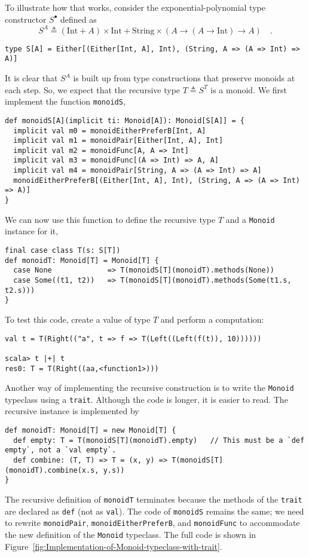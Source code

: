 To illustrate how that works, consider the exponential-polynomial
type constructor $S^{\bullet}$ defined as
\[
S^{A}\triangleq\left(\text{Int}+A\right)\times\text{Int}+\text{String}\times\left(A\rightarrow\left(A\rightarrow\text{Int}\right)\rightarrow A\right)\quad.
\]
\begin{lstlisting}
type S[A] = Either[(Either[Int, A], Int), (String, A => (A => Int) => A)]
\end{lstlisting}

It is clear that $S^{A}$ is built up from type constructions that
preserve monoids at each step. So, we expect that the recursive type
$T\triangleq S^{T}$ is a monoid. We first implement the function
\lstinline!monoidS!,
\begin{lstlisting}
def monoidS[A](implicit ti: Monoid[A]): Monoid[S[A]] = {
  implicit val m0 = monoidEitherPreferB[Int, A]
  implicit val m1 = monoidPair[Either[Int, A], Int]
  implicit val m2 = monoidFunc[A, A => Int]
  implicit val m3 = monoidFunc[(A => Int) => A, A]
  implicit val m4 = monoidPair[String, A => (A => Int) => A]
  monoidEitherPreferB[(Either[Int, A], Int), (String, A => (A => Int) => A)]
}
\end{lstlisting}
We can now use this function to define the recursive type $T$ and
a \lstinline!Monoid! instance for it,
\begin{lstlisting}
final case class T(s: S[T])
def monoidT: Monoid[T] = Monoid[T] {
  case None             => T(monoidS[T](monoidT).methods(None))
  case Some((t1, t2))   => T(monoidS[T](monoidT).methods(Some(t1.s, t2.s)))
}
\end{lstlisting}
To test this code, create a value of type $T$ and perform a computation:
\begin{lstlisting}
val t = T(Right(("a", t => f => T(Left((Left(f(t)), 10))))))

scala> t |+| t
res0: T = T(Right((aa,<function1>)))
\end{lstlisting}

Another way of implementing the recursive construction is to write
the \lstinline!Monoid! typeclass using a \lstinline!trait!. Although
the code is longer, it is easier to read. The recursive instance is
implemented by
\begin{lstlisting}
def monoidT: Monoid[T] = new Monoid[T] {
  def empty: T = T(monoidS[T](monoidT).empty)   // This must be a `def empty`, not a `val empty`.
  def combine: (T, T) => T = (x, y) => T(monoidS[T](monoidT).combine(x.s, y.s))
}
\end{lstlisting}
 The recursive definition of \lstinline!monoidT! terminates because
the methods of the \lstinline!trait! are declared as \lstinline!def!
(not as \lstinline!val!). The code of \lstinline!monoidS! remains
the same; we need to rewrite \lstinline!monoidPair!, \lstinline!monoidEitherPreferB!,
and \lstinline!monoidFunc! to accommodate the new definition of the
\lstinline!Monoid! typeclass. The full code is shown in Figure~\ref{fig:Implementation-of-Monoid-typeclass-with-trait}.

